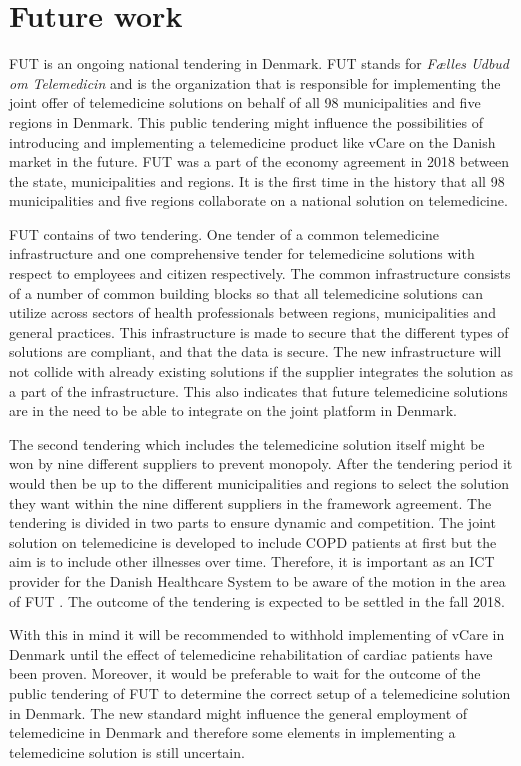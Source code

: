 \section{Future work}

FUT is an ongoing national tendering in Denmark. FUT stands for \textit{Fælles Udbud om Telemedicin} and is the organization that is responsible for implementing the joint offer of telemedicine solutions on behalf of all 98 municipalities and five regions in Denmark. This public tendering might influence the possibilities of introducing and implementing a telemedicine product like vCare on the Danish market in the future. FUT was a part of the economy agreement in 2018 between the state, municipalities and regions. It is the first time in the history that all 98 municipalities and five regions collaborate on a national solution on telemedicine. 

FUT contains of two tendering. One tender of a common telemedicine infrastructure and one comprehensive tender for telemedicine solutions with respect to employees and citizen respectively. The common infrastructure consists of a number of common building blocks so that all telemedicine solutions can utilize across sectors of health professionals between regions, municipalities and general practices. This infrastructure is made to secure that the different types of solutions are compliant, and that the data is secure. The new infrastructure will not collide with already existing solutions if the supplier integrates the solution as a part of the infrastructure. This also indicates that future telemedicine solutions are in the need to be able to integrate on the joint platform in Denmark. 

The second tendering which includes the telemedicine solution itself might be won by nine different suppliers to prevent monopoly. After the tendering period it would then be up to the different municipalities and regions to select the solution they want within the nine different suppliers in the framework agreement. The tendering is divided in two parts to ensure dynamic and competition. 	
The joint solution on telemedicine is developed to include COPD patients at first but the aim is to include other illnesses over time. Therefore, it is important as an ICT provider for the Danish Healthcare System to be aware of the motion in the area of FUT \cite{FUT, FUT2}. The outcome of the tendering is expected to be settled in the fall 2018. 

With this in mind it will be recommended to withhold implementing of vCare in Denmark until the effect of telemedicine rehabilitation of cardiac patients have been proven. Moreover, it would be preferable to wait for the outcome of the public tendering of FUT to determine the correct setup of a telemedicine solution in Denmark. The new standard might influence the general employment of telemedicine in Denmark and therefore some elements in implementing a telemedicine solution is still uncertain. 






